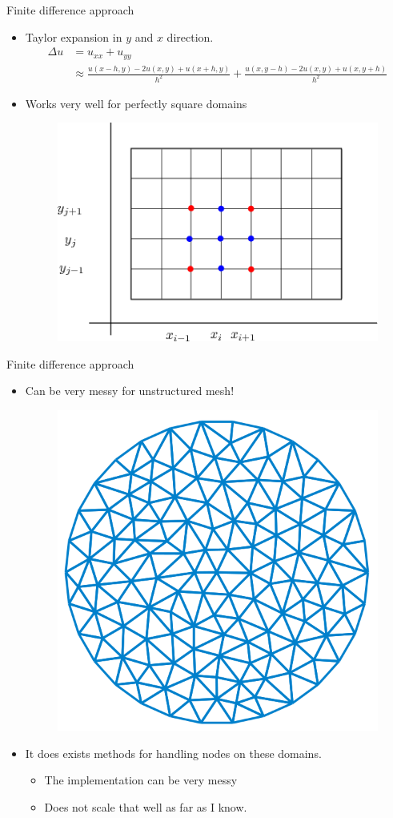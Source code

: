 \begin{frame}{}
        \begin{block}{Finite difference approach}
            \begin{itemize}
                \item Taylor expansion in $y$ and $x$ direction. \[
                        \begin{split}
                \Delta u & = u_{xx} + u_{yy} \\
                & \approx  \frac{u( x-h, y) - 2u( x,y) + u( x +h,y)   }{h^2} + \frac{u( x, y-h) - 2u( x,y) + u( x,y +h)   }{h^2}
                        \end{split}
                \]
            \item Works very well for perfectly square domains
                \begin{figure}
                    \centering
                    \includegraphics[width=0.35 \textwidth]{figures/fdm.png}
                \end{figure}
            \end{itemize}
        \end{block}
\end{frame}

\begin{frame}{}
        \begin{block}{Finite difference approach}
            \begin{itemize}
            \item Can be very messy for unstructured mesh!
                \begin{figure}
                    \centering
                    \includegraphics[width=0.35 \textwidth]{figures/triangulation.png}
                \end{figure}
            \item It does exists methods for handling nodes on these domains.
                \begin{itemize}
                    \item The implementation can be very messy
                    \item Does not scale that well as far as I know.
                \end{itemize}
            \end{itemize}
        \end{block}
\end{frame}



